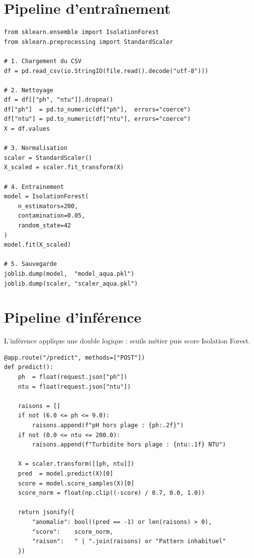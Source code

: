 \documentclass[12pt,a4paper]{report}
\begin{document}
\section{Pipeline d'entraînement}

\begin{lstlisting}[language=Python3,caption={Pipeline d'entraînement -- ai\_service.py}]
from sklearn.ensemble import IsolationForest
from sklearn.preprocessing import StandardScaler

# 1. Chargement du CSV
df = pd.read_csv(io.StringIO(file.read().decode("utf-8")))

# 2. Nettoyage
df = df[["ph", "ntu"]].dropna()
df["ph"]  = pd.to_numeric(df["ph"],  errors="coerce")
df["ntu"] = pd.to_numeric(df["ntu"], errors="coerce")
X = df.values

# 3. Normalisation
scaler = StandardScaler()
X_scaled = scaler.fit_transform(X)

# 4. Entrainement
model = IsolationForest(
    n_estimators=200,
    contamination=0.05,
    random_state=42
)
model.fit(X_scaled)

# 5. Sauvegarde
joblib.dump(model,  "model_aqua.pkl")
joblib.dump(scaler, "scaler_aqua.pkl")
\end{lstlisting}

\section{Pipeline d'inférence}

L'inférence applique une double logique : seuils métier puis score Isolation Forest.

\begin{lstlisting}[language=Python3,caption={Pipeline d'inférence -- ai\_service.py}]
@app.route("/predict", methods=["POST"])
def predict():
    ph  = float(request.json["ph"])
    ntu = float(request.json["ntu"])

    raisons = []
    if not (6.0 <= ph <= 9.0):
        raisons.append(f"pH hors plage : {ph:.2f}")
    if not (0.0 <= ntu <= 200.0):
        raisons.append(f"Turbidite hors plage : {ntu:.1f} NTU")

    X = scaler.transform([[ph, ntu]])
    pred  = model.predict(X)[0]
    score = model.score_samples(X)[0]
    score_norm = float(np.clip((-score) / 0.7, 0.0, 1.0))

    return jsonify({
        "anomalie": bool((pred == -1) or len(raisons) > 0),
        "score":    score_norm,
        "raison":   " | ".join(raisons) or "Pattern inhabituel"
    })
\end{lstlisting}
\end{document}
